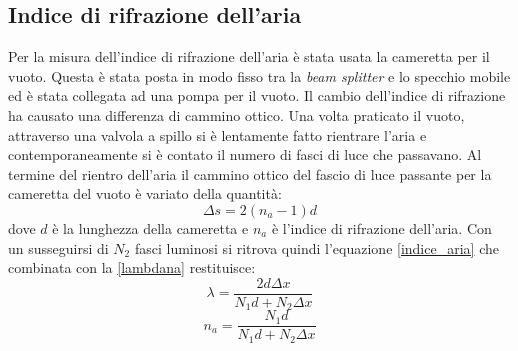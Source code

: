\documentclass[a4paper,11pt]{article}
\begin{document}
	\subsection{Indice di rifrazione dell'aria}
	Per la misura dell'indice di rifrazione dell'aria è stata usata la cameretta per il vuoto. Questa è stata posta in modo fisso tra la \emph{beam splitter} e lo specchio mobile ed è stata collegata ad una pompa per il vuoto. Il cambio dell'indice di rifrazione ha causato una differenza di cammino ottico. Una volta praticato il vuoto, attraverso una valvola a spillo si è lentamente fatto rientrare l'aria e contemporaneamente si è contato il numero di fasci di luce che passavano. Al termine del rientro dell'aria il cammino ottico del fascio di luce passante per la cameretta del vuoto è variato della quantità:
	\begin{equation}\label{deltavuoto}
		\Delta s = 2(n_a-1)d
	\end{equation}
	dove $ d $ è la lunghezza della cameretta e $ n_a $ è l'indice di rifrazione dell'aria. Con un susseguirsi di $ N_2 $ fasci luminosi si ritrova quindi l'equazione \ref{indice_aria} che combinata con la \ref{lambdana} restituisce:
	\begin{equation}\label{lambda}
		\lambda=\dfrac{2d\Delta x}{N_1 d + N_2 \Delta x}
	\end{equation}
	\begin{equation}\label{na}
		n_a=\dfrac{N_1 d}{N_1 d + N_2 \Delta x}
	\end{equation}
\end{document}
